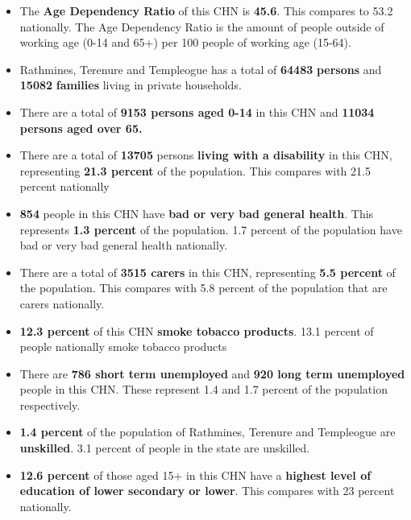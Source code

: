 \documentclass{article}
\begin{document}
\begin{itemize}

\item The \textbf{Age Dependency Ratio} of this CHN is  \textbf{45.6}. This compares to 53.2 nationally. The Age Dependency Ratio is the amount of people outside of working age (0-14 and 65+) per 100 people of working age (15-64). 

\item Rathmines, Terenure and Templeogue has a total of \textbf{\num{64483}} \textbf{persons} and  \textbf{\num{15082}} \textbf{families} living in private households.

\item There are a total of \textbf{\num{9153} persons aged 0-14} in this CHN and \textbf{\num{11034} persons aged over 65.} 

\item There are a total of \textbf{\num{13705}} persons \textbf{living with a disability} in this CHN, representing \textbf{21.3 percent} of the population. This compares with  21.5 percent nationally

\item \textbf{\num{854}} people in this CHN have \textbf{bad or very bad general health}. This represents \textbf{1.3 percent} of the population. 1.7 percent of the population have bad or very bad general health nationally. 

\item There are a total of \textbf{\num{3515} carers} in this CHN, representing \textbf{5.5 percent} of the population. This compares with 5.8 percent of the population that are carers nationally. 

\item \textbf{12.3 percent} of this CHN \textbf{smoke tobacco products}. 13.1 percent of people nationally smoke tobacco products

\item There are \textbf{\num{786} short term unemployed} and \textbf{\num{920} long term unemployed} people in this CHN. These represent 1.4 and 1.7 percent of the population respectively.

\item  \textbf{1.4 percent} of the population of Rathmines, Terenure and Templeogue are \textbf{unskilled}. 3.1 percent of people in the state are unskilled.

\item \textbf{12.6 percent} of those aged 15+ in this CHN have a \textbf{highest level of education of lower secondary or lower}. This compares with 23 percent nationally. 


\end{itemize}
\end{document}
